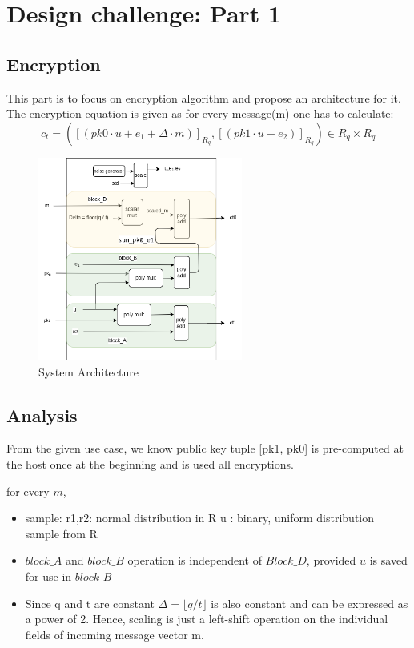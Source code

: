 \documentclass{article}
\begin{document}
    \section{Design challenge: Part 1}

    \subsection{Encryption}
    This part is to focus on encryption algorithm and propose an architecture for it. The encryption equation is given as for every message(m) one has to calculate: 
    $$
    c_t = \left( \left[ (pk0 \cdot u + e_1 + \Delta \cdot m) \right]_{R_q} ,
                 \left[ (pk1 \cdot u + e_2) \right]_{R_q} \right)  \in {R_q}\times {R_q}
    $$
    
    \begin{figure}[htp] 
      \centering
      \includegraphics[width=0.6\textwidth]{FV12_encryption.png}
      \caption{System Architecture}
      \label{fig:sysarch} 
    \end{figure}

    \subsection{Analysis}
    From the given use case, we know public key tuple [pk1, pk0] is pre-computed at the host once at the beginning and is used all encryptions.

    for every $m$,
    \begin{itemize}
      \item sample: r1,r2: normal distribution in R
            \subitem u : binary, uniform distribution sample from R
      \item $block\_A$  and $block\_B$ operation is independent of $Block\_D$, provided $u$ is saved for use in $block\_B$
      \item Since q and t are constant $\Delta=\lfloor q/t \rfloor$ is also constant and can be expressed as a power of 2. 
            Hence, scaling is just a left-shift operation on the individual fields of incoming message vector m.
    \end{itemize}
\end{document}
